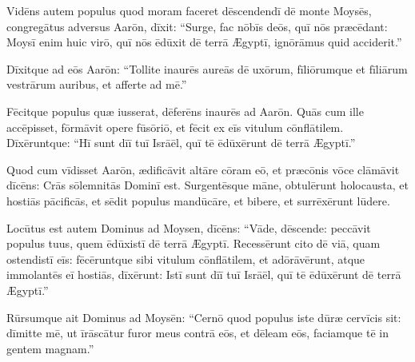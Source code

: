 Vidēns autem populus quod moram faceret dēscendendī dē monte
Moysēs, congregātus adversus Aarōn, dīxit: ``Surge, fac nōbīs deōs, quī
nōs præcēdant: Moysī enim huic
virō, quī nōs ēdūxit dē terrā Ægyptī, ignōrāmus quid acciderit.''

Dīxitque
ad eōs Aarōn: ``Tollite inaurēs aureās dē uxōrum,
fīliōrumque et fīliārum vestrārum auribus, et afferte ad mē.''

Fēcitque
populus quæ iusserat, dēferēns inaurēs
ad Aarōn. 
Quās cum ille accēpisset, fōrmāvit opere fūsōriō, et fēcit ex
eīs vitulum cōnflātilem. Dīxēruntque: ``Hī
sunt dīī tuī Isrāēl, quī tē ēdūxērunt dē terrā Ægyptī.''

Quod cum vīdisset Aarōn, ædificāvit altāre cōram eō, et
præcōnis vōce clāmāvit dīcēns: Crās sōlemnitās Dominī est. 
Surgentēsque māne, obtulērunt
holocausta, et hostiās
pācificās, et sēdit populus
mandūcāre, et bibere, et surrēxērunt lūdere. 

Locūtus est
autem Dominus ad Moysen, dīcēns: ``Vāde, dēscende:
peccāvit populus tuus, quem
ēdūxistī dē terrā Ægyptī. 
Recessērunt cito dē viā, quam ostendistī eīs:
fēcēruntque sibi vitulum cōnflātilem, et adōrāvērunt, atque
immolantēs eī hostiās, dīxērunt: Istī
sunt dīī tuī Isrāēl, quī tē ēdūxērunt dē terrā Ægyptī.'' 

Rūrsumque ait Dominus ad Moysēn: ``Cernō quod populus iste
dūræ cervīcis sit: 
dīmitte mē, ut īrāscātur furor meus contrā
eōs, et dēleam eōs, faciamque tē in gentem magnam.'' 

